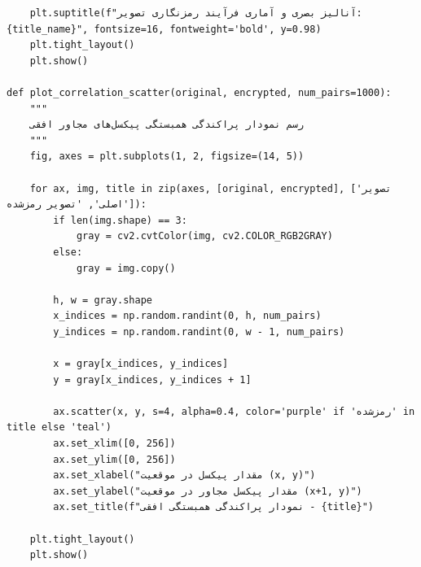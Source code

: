 \begin{latin}
\begin{verbatim}
    plt.suptitle(f"آنالیز بصری و آماری فرآیند رمزنگاری تصویر: {title_name}", fontsize=16, fontweight='bold', y=0.98)
    plt.tight_layout()
    plt.show()

def plot_correlation_scatter(original, encrypted, num_pairs=1000):
    """
    رسم نمودار پراکندگی همبستگی پیکسل‌های مجاور افقی
    """
    fig, axes = plt.subplots(1, 2, figsize=(14, 5))
    
    for ax, img, title in zip(axes, [original, encrypted], ['تصویر اصلی', 'تصویر رمزشده']):
        if len(img.shape) == 3:
            gray = cv2.cvtColor(img, cv2.COLOR_RGB2GRAY)
        else:
            gray = img.copy()
            
        h, w = gray.shape
        x_indices = np.random.randint(0, h, num_pairs)
        y_indices = np.random.randint(0, w - 1, num_pairs)
        
        x = gray[x_indices, y_indices]
        y = gray[x_indices, y_indices + 1]
        
        ax.scatter(x, y, s=4, alpha=0.4, color='purple' if 'رمزشده' in title else 'teal')
        ax.set_xlim([0, 256])
        ax.set_ylim([0, 256])
        ax.set_xlabel("مقدار پیکسل در موقعیت (x, y)")
        ax.set_ylabel("مقدار پیکسل مجاور در موقعیت (x+1, y)")
        ax.set_title(f"نمودار پراکندگی همبستگی افقی - {title}")
        
    plt.tight_layout()
    plt.show()
\end{verbatim}
\end{latin}


